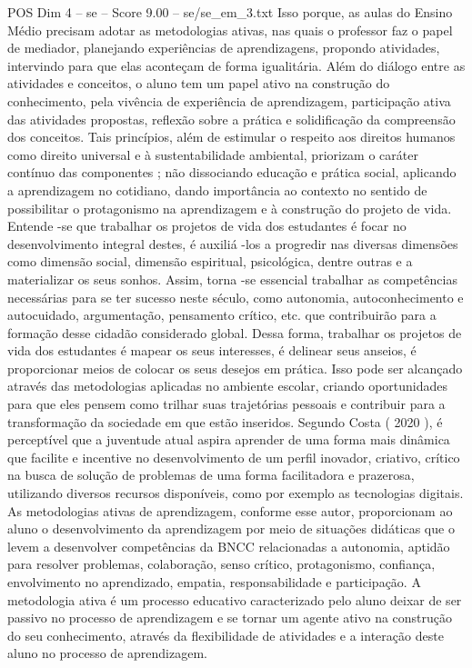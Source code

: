 \begin{textsample}{POS Dim 4 – se – Score 9.00 – se/se\_em\_3.txt}
Isso porque, as aulas do Ensino Médio precisam adotar as metodologias ativas, nas quais o professor faz o papel de mediador, planejando experiências de aprendizagens, propondo atividades, intervindo para que elas aconteçam de forma igualitária.
Além do diálogo entre as atividades e conceitos, o aluno tem um papel ativo na construção do conhecimento, pela vivência de experiência de aprendizagem, participação ativa das atividades propostas, reflexão sobre a prática e solidificação da compreensão dos conceitos.
Tais princípios, além de estimular o respeito aos direitos humanos como direito universal e à sustentabilidade ambiental, priorizam o caráter contínuo das componentes ; não dissociando educação e prática social, aplicando a aprendizagem no cotidiano, dando importância ao contexto no sentido de possibilitar o protagonismo na aprendizagem e à construção do projeto de vida.
Entende -se que trabalhar os projetos de vida dos estudantes é focar no desenvolvimento integral destes, é auxiliá -los a progredir nas diversas dimensões como dimensão social, dimensão espiritual, psicológica, dentre outras e a materializar os seus sonhos.
Assim, torna -se essencial trabalhar as competências necessárias para se ter sucesso neste século, como autonomia, autoconhecimento e autocuidado, argumentação, pensamento crítico, etc. que contribuirão para a formação desse cidadão considerado global.
Dessa forma, trabalhar os projetos de vida dos estudantes é mapear os seus interesses, é delinear seus anseios, é proporcionar meios de colocar os seus desejos em prática.
Isso pode ser alcançado através das metodologias aplicadas no ambiente escolar, criando oportunidades para que eles pensem como trilhar suas trajetórias pessoais e contribuir para a transformação da sociedade em que estão inseridos.
Segundo Costa ( 2020 ), é perceptível que a juventude atual aspira aprender de uma forma mais dinâmica que facilite e incentive no desenvolvimento de um perfil inovador, criativo, crítico na busca de solução de problemas de uma forma facilitadora e prazerosa, utilizando diversos recursos disponíveis, como por exemplo as tecnologias digitais.
As metodologias ativas de aprendizagem, conforme esse autor, proporcionam ao aluno o desenvolvimento da aprendizagem por meio de situações didáticas que o levem a desenvolver competências da BNCC relacionadas a autonomia, aptidão para resolver problemas, colaboração, senso crítico, protagonismo, confiança, envolvimento no aprendizado, empatia, responsabilidade e participação.
A metodologia ativa é um processo educativo caracterizado pelo aluno deixar de ser passivo no processo de aprendizagem e se tornar um agente ativo na construção do seu conhecimento, através da flexibilidade de atividades e a interação deste aluno no processo de aprendizagem.

\end{textsample}
